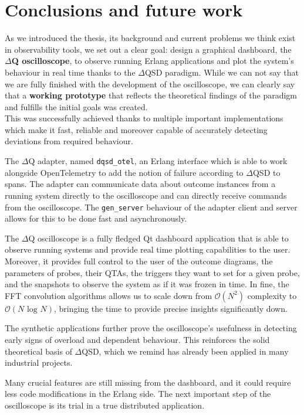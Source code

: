 \chapter{Conclusions and future work}

    As we introduced the thesis, its background and current problems we think exist in observability tools, we set out a clear goal: design a graphical dashboard, the \textbf{$\Delta$Q oscilloscope}, to observe running Erlang applications and plot the system's behaviour in real time thanks to the $\Delta$QSD paradigm.
    While we can not say that we are fully finished with the development of the oscilloscope, we can clearly say that a \textbf{working prototype} that reflects the theoretical findings of the paradigm and fulfills the initial goals was created. \\
    This was successfully achieved thanks to multiple important implementations which make it fast, reliable and moreover capable of accurately detecting deviations from required behaviour.
    
    The $\Delta$Q adapter, named \texttt{dqsd\_otel}, an Erlang interface which is able to work alongside OpenTelemetry to add the notion of failure according to $\Delta$QSD to spans. The adapter can communicate data about outcome instances from a running system directly to the oscilloscope and can directly receive commands from the oscilloscope. The \texttt{gen\_server} behaviour of the adapter client and server allows for this to be done fast and asynchronously.

    The $\Delta$Q oscilloscope is a fully fledged Qt dashboard application that is able to observe running systems and provide real time plotting capabilities to the user. Moreover, it provides full control to the user of the outcome diagrams, the parameters of probes, their QTAs, the triggers they want to set for a given probe, and the snapshots to observe the system as if it was frozen in time. In fine, the FFT convolution algorithms allows us to scale down from $\mathcal{O}(N^2)$ complexity to $\mathcal{O}(N\text{ log }N)$, bringing the time to provide precise insights significantly down.

    The synthetic applications further prove the oscilloscope's usefulness in detecting early signs of overload and dependent behaviour. This reinforces the solid theoretical basis of $\Delta$QSD, which we remind has already been applied in many industrial projects.

    Many crucial features are still missing from the dashboard, and it could require less code modifications in the Erlang side. The next important step of the oscilloscope is its trial in a true distributed application.

